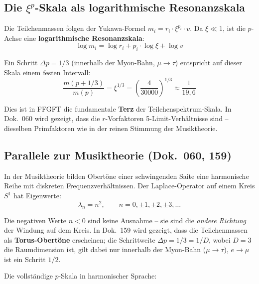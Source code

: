 \subsection{Die \texorpdfstring{$\xi^p$}{xi\^{}p}-Skala als logarithmische Resonanzskala}

Die Teilchenmassen folgen der Yukawa-Formel $m_i = r_i \cdot \xi^{p_i} \cdot v$.
Da $\xi \ll 1$, ist die $p$-Achse eine \textbf{logarithmische Resonanzskala}:
\begin{equation}
    \log m_i = \log r_i + p_i \cdot \log \xi + \log v
\end{equation}

Ein Schritt $\Delta p = 1/3$ (innerhalb der Myon-Bahn, $\mu\to\tau$) entspricht auf
dieser Skala einem festen Intervall:
\begin{equation}
    \frac{m(p + 1/3)}{m(p)} = \xi^{1/3}
    = \left(\frac{4}{30000}\right)^{1/3} \approx \frac{1}{19{,}6}
\end{equation}

Dies ist in FFGFT die fundamentale \textbf{Terz} der Teilchenspektrum-Skala.
In Dok.~060 wird gezeigt, dass die $r$-Vorfaktoren 5-Limit-Verhältnisse
sind -- dieselben Primfaktoren wie in der reinen Stimmung der Musiktheorie.

\subsection{Parallele zur Musiktheorie (Dok.~060, 159)}

In der Musiktheorie bilden Obertöne einer schwingenden Saite eine
harmonische Reihe mit diskreten Frequenzverhältnissen. Der Laplace-Operator
auf einem Kreis $S^1$ hat Eigenwerte:
\begin{equation}
    \lambda_n = n^2, \qquad n = 0, \pm 1, \pm 2, \pm 3, \ldots
\end{equation}

Die negativen Werte $n < 0$ sind keine Ausnahme -- sie sind die
\emph{andere Richtung} der Windung auf dem Kreis. In Dok.~159 wird
gezeigt, dass die Teilchenmassen als \textbf{Torus-Obertöne} erscheinen;
die Schrittweite $\Delta p = 1/3 = 1/D$, wobei $D = 3$ die Raumdimension ist,
gilt dabei nur innerhalb der Myon-Bahn ($\mu\to\tau$), $e\to\mu$ ist ein
Schritt $1/2$.

Die vollständige $p$-Skala in harmonischer Sprache:

